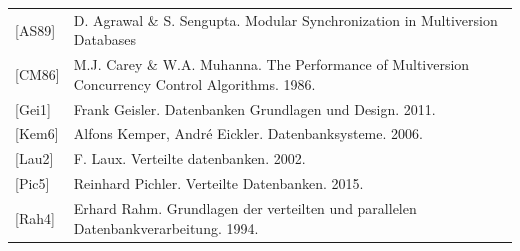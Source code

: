 \documentclass[letterpaper, 12pt]{article}
\begin{document}


\begin{tabular}{ll}
	{[AS89]} & D. Agrawal \& S. Sengupta. Modular Synchronization in Multiversion Databases\\
	{[CM86]} & M.J. Carey \& W.A. Muhanna. The Performance of Multiversion Concurrency Control Algorithms. 1986. \\
	{[Gei1]} & Frank Geisler. Datenbanken Grundlagen und Design. 2011.\\
	{[Kem6]} & Alfons Kemper, André Eickler. Datenbanksysteme. 2006.\\
	{[Lau2]} & F. Laux. Verteilte datenbanken. 2002.\\
	{[Pic5]} & Reinhard Pichler. Verteilte Datenbanken. 2015.\\
	{[Rah4]} & Erhard Rahm. Grundlagen der verteilten und parallelen Datenbankverarbeitung. 1994.\\	
\end{tabular}

\listoffigures
\end{document}
